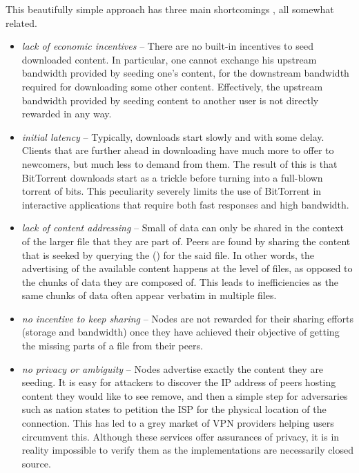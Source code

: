 This beautifully simple approach has three main shortcomings \cite{locher2006free,piatek2007incentives}, all somewhat related.

\begin{itemize}
\item \emph{lack of economic incentives} -- 
There are no built-in incentives to seed downloaded content. In particular, one cannot exchange his upstream bandwidth provided by seeding one's content, for the downstream bandwidth required for downloading some other content. Effectively, the upstream bandwidth provided by seeding content to another user is not directly rewarded in any way.
\item \emph{initial latency} -- 
 Typically, downloads start slowly and with some delay. Clients that are further ahead in downloading have much more to offer to newcomers, but much less to demand from them. The result of this is that BitTorrent downloads start as a trickle before turning into a full-blown torrent of bits. This peculiarity severely limits the use of BitTorrent in interactive applications that require both fast responses and high bandwidth.
\item \emph{lack of content addressing} -- Small  of data can only be shared in the context of the larger file that they are part of. Peers are found by sharing the content that is seeked by querying the  () for the said file. In other words, the advertising of the available content happens at the level of files, as opposed to the chunks of data they are composed of. This leads to inefficiencies as the same chunks of data often appear verbatim in multiple files. 
\item \emph{no incentive to keep sharing} --
Nodes are not rewarded for their sharing efforts (storage and bandwidth) once they have achieved their objective of getting the missing parts of a file from their peers.
\item \emph{no privacy or ambiguity} --
Nodes advertise exactly the content they are seeding. It is easy for attackers to discover the IP address of peers hosting content they would like to see remove, and then a simple step for adversaries such as nation states to petition the ISP for the physical location of the connection. This has led to a grey market of VPN providers helping users circumvent this. Although these services offer assurances of privacy, it is in reality impossible to verify them as the implementations are necessarily closed source.
\end{itemize}


